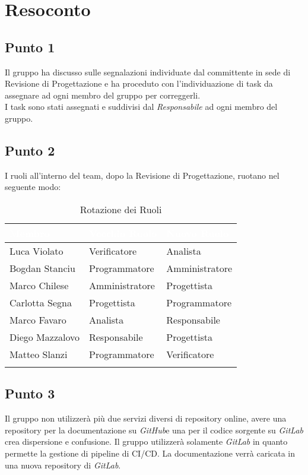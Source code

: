 \section{Resoconto}

\subsection{Punto 1}
Il gruppo ha discusso sulle segnalazioni individuate dal committente in sede di Revisione di Progettazione e ha proceduto con l'individuazione di task da assegnare ad ogni membro del gruppo per correggerli.
\\
I task sono stati assegnati e suddivisi dal \textit{Responsabile} ad ogni membro del gruppo.

\subsection{Punto 2}
I ruoli all'interno del team, dopo la Revisione di Progettazione, ruotano nel seguente modo:\\

\begin{center}
	\begin{longtable}[c]{|m{}|m{}|m{}|} 
		\hline
		\rowcolor{bluelogo}\textbf{\textcolor{white}{Membro}} & \textbf{\textcolor{white}{Vecchio Ruolo}} & \textbf{\textcolor{white}{Nuovo Ruolo}}\\
		\hline
		\hline
		Luca Violato & Verificatore & Analista \\
		\hline
		\rowcolor{grigio}Bogdan Stanciu & Programmatore & Amministratore \\
		\hline
		Marco Chilese & Amministratore & Progettista\\
		\hline
		\rowcolor{grigio}Carlotta Segna & Progettista & Programmatore\\
		\hline
		Marco Favaro & Analista & Responsabile \\
		\hline
		\rowcolor{grigio} Diego Mazzalovo & Responsabile & Progettista\\
		\hline
		Matteo Slanzi & Programmatore & Verificatore\\
		\hline
		\caption{Rotazione dei Ruoli}
	\end{longtable}

\end{center}
	

\subsection{Punto 3}
Il gruppo non utilizzerà più due servizi diversi di repository online, avere una repository per la documentazione su \textit{GitHub}\glossario e una per il codice sorgente su \textit{GitLab} crea dispersione e confusione. Il gruppo utilizzerà solamente \textit{GitLab} in quanto permette la gestione di pipeline di CI/CD\glossario. La documentazione verrà caricata in una nuova repository di \textit{GitLab}.

